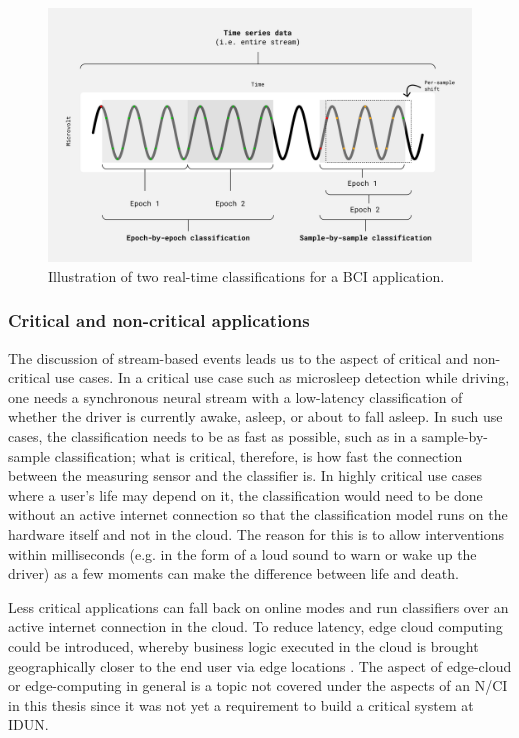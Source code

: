 \begin{figure}[!ht]
  \centering
  \includegraphics[width=\linewidth]{per-sample.png}
  \caption{Illustration of two real-time classifications for a BCI application.}
  \label{fig:per-sample}
\end{figure}

\subsubsection{Critical and non-critical applications}
\label{chapter5-critical-and-non-critical-applications}

The discussion of stream-based events leads us to the aspect of critical and non-critical use cases. In a critical use case such as microsleep detection while driving, one needs a synchronous neural stream with a low-latency classification of whether the driver is currently awake, asleep, or about to fall asleep. In such use cases, the classification needs to be as fast as possible, such as in a sample-by-sample classification; what is critical, therefore, is how fast the connection between the measuring sensor and the classifier is. In highly critical use cases where a user’s life may depend on it, the classification would need to be done without an active internet connection so that the classification model runs on the hardware itself and not in the cloud. The reason for this is to allow interventions within milliseconds (e.g. in the form of a loud sound to warn or wake up the driver) as a few moments can make the difference between life and death.

Less critical applications can fall back on online modes and run classifiers over an active internet connection in the cloud. To reduce latency, edge cloud computing could be introduced, whereby business logic executed in the cloud is brought geographically closer to the end user via edge locations \citep{nomios_what_nodate}. The aspect of edge-cloud or edge-computing in general is a topic not covered under the aspects of an N/CI in this thesis since it was not yet a requirement to build a critical system at IDUN.

